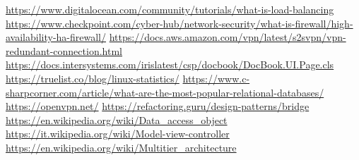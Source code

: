 \begin{thebibliography}{9}
     \url{https://www.digitalocean.com/community/tutorials/what-is-load-balancing}
     \url{https://www.checkpoint.com/cyber-hub/network-security/what-is-firewall/high-availability-ha-firewall/}
     \url{https://docs.aws.amazon.com/vpn/latest/s2svpn/vpn-redundant-connection.html}
     \url{https://docs.intersystems.com/irislatest/csp/docbook/DocBook.UI.Page.cls}
     \url{https://truelist.co/blog/linux-statistics/}
     \url{https://www.c-sharpcorner.com/article/what-are-the-most-popular-relational-databases/}
     \url{https://openvpn.net/}
     \url{https://refactoring.guru/design-patterns/bridge}
     \url{https://en.wikipedia.org/wiki/Data_access_object}
     \url{https://it.wikipedia.org/wiki/Model-view-controller}
     \url{https://en.wikipedia.org/wiki/Multitier_architecture}
\end{thebibliography}